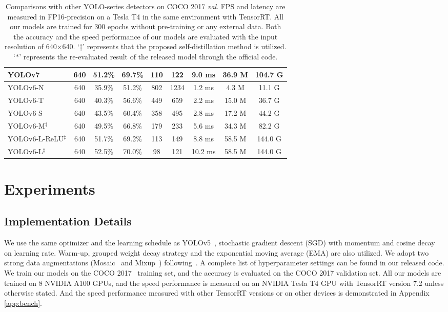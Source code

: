 \documentclass[10pt,twocolumn,letterpaper]{article}
\begin{document}
\begin{table*}[h]
{\begin{tabular}{l|c|c|c|c|c|c|c|c}
        YOLOv7~\cite{wang2022yolov7}  & 640 & 51.2\% & 69.7\% & 110 & 122 & 9.0 ms & 36.9 M& 104.7 G \\
        \midrule
        \midrule
        YOLOv6-N & 640 & 35.9\% & 51.2\% & 802 & 1234 &1.2 ms &4.3 M & 11.1 G \\
        YOLOv6-T & 640 & 40.3\% & 56.6\% & 449 & 659 &2.2 ms & 15.0 M & 36.7 G \\
        YOLOv6-S & 640 & 43.5\% & 60.4\% & 358 & 495 &2.8 ms & 17.2 M & 44.2 G \\
        YOLOv6-M$^\ddagger$ & 640 & 49.5\% & 66.8\%& 179 & 233 & 5.6 ms & 34.3 M & 82.2 G \\
        YOLOv6-L-ReLU$^\ddagger$ & 640 & 51.7\% & 69.2\%&  113& 149 & 8.8 ms & 58.5 M & 144.0 G \\
        YOLOv6-L$^\ddagger$ & 640 & 52.5\% & 70.0\% & 98  & 121 &10.2 ms & 58.5 M & 144.0 G \\
        \bottomrule
      \end{tabular}
    }
    \caption{
      Comparisons with other YOLO-series detectors on COCO 2017 \emph{val}. FPS and latency are measured  in FP16-precision on a Tesla T4 in the same environment with TensorRT. All our models are trained for 300 epochs without pre-training or any external data. Both the accuracy and the speed performance of our models are evaluated with the input resolution of 640$\times$640. `$\ddagger$' represents that the proposed self-distillation method is utilized. `$*$' represents the re-evaluated result of the released model through the official code.
    }
    \label{tab:sota}
  \end{table*}

\section{Experiments}
\label{sec:exp}
\subsection{Implementation Details}
We use the same optimizer and the learning schedule as YOLOv5~\cite{yolov5}, \ie stochastic gradient descent (SGD) with momentum and cosine decay on learning rate. Warm-up, grouped weight decay strategy and the exponential moving average (EMA) are also utilized. We adopt two strong data augmentations (Mosaic~\cite{bochkovskiy2020yolov4, yolov5} and Mixup~\cite{zhang2017mixup}) following~\cite{bochkovskiy2020yolov4,yolov5,ge2021yolox}. A complete list of hyperparameter settings can be found in our released code. We train our models on the COCO 2017~\cite{lin2014microsoft} training set, and the accuracy is evaluated on the COCO 2017 validation set. All our models are trained on 8 NVIDIA A100 GPUs, and the speed performance is measured on an NVIDIA Tesla T4 GPU with TensorRT version 7.2 unless otherwise stated. And the speed performance measured with other TensorRT versions or on other devices is demonstrated in Appendix \ref{app:bench}.
\end{document}
